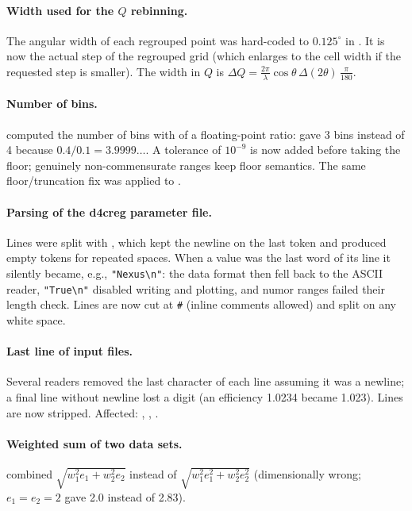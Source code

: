 \documentclass[11pt,a4paper]{article}
\begin{document}
\paragraph{ Width used for the $Q$ rebinning.} The angular width
of each regrouped point was hard-coded to $0.125^\circ$ in .
It is now the actual step of the regrouped grid (which 
enlarges to the cell width if the requested step is smaller). The width
in $Q$ is $\Delta Q = \frac{2\pi}{\lambda}\cos\theta\,\Delta(2\theta)\,\frac{\pi}{180}$.

\paragraph{ Number of bins.}  computed the number
of bins with  of a floating-point ratio:
 gave 3 bins instead of 4 because
$0.4/0.1 = 3.9999\ldots$. A tolerance of $10^{-9}$ is now added before
taking the floor; genuinely non-commensurate ranges keep floor semantics.
The same floor/truncation fix was applied to .

\paragraph{ Parsing of the d4creg parameter file.} Lines were
split with , which kept the newline on the last token and
produced empty tokens for repeated spaces. When a value was the last word
of its line it silently became, e.g., \verb|"Nexus\n"|: the data format
then fell back to the ASCII reader, \verb|"True\n"| disabled writing and
plotting, and numor ranges failed their length check. Lines are now cut
at \texttt{\#} (inline comments allowed) and split on any white space.

\paragraph{ Last line of input files.} Several readers removed
the last character of each line assuming it was a newline; a final line
without newline lost a digit (an efficiency 1.0234 became 1.023). Lines
are now stripped. Affected: , , .

\paragraph{ Weighted sum of two data sets.} \newbeh{}
 combined $\sqrt{w_1^2 e_1 + w_2^2 e_2}$ instead of
$\sqrt{w_1^2 e_1^2 + w_2^2 e_2^2}$ (dimensionally wrong; $e_1=e_2=2$ gave
2.0 instead of 2.83).
\end{document}
